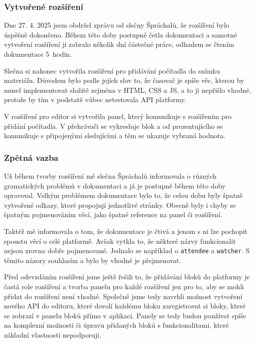 \subsubsection{Vytvořené rozšíření}

Dne 27. 4. 2025 jsem obdržel zprávu od slečny Špráchalů, že rozšíření bylo úspěšně dokončeno.
Během této doby postupně četla dokumentaci a samotné vytvoření rozšíření ji zabralo několik dní částečné práce, odhadem se čtením dokumentace 5~hodin.

Slečna si nakonec vytvořila rozšíření pro přidávání počítadla do snímku materiálu.
Důvodem bylo podle jejích slov to, že časovač je spíše věc, kterou by musel implementovat složitě zejména v HTML, CSS a JS, a to ji nepřišlo vhodné, protože by tím v podstatě vůbec netestovala API platformy.

V rozšíření pro editor si vytvořila panel, který komunikuje s rozšířením pro přidání počítadla. V přehrávači se vykresluje blok a od prezentujícího se komunikuje s připojenými sledujícími a těm se ukazuje vybraná hodnota.

\subsubsection{Zpětná vazba}

Už během tvorby rozšíření mě slečna Špráchalů informovala o různých gramatických problémů v dokumentaci a já je postupně během této doby opravoval.
Velkým problémem dokumentace bylo to, že celou dobu byly špatně vytvořené odkazy, které propojují jednotlivé stránky.
Obecně byly i chyby se špatným pojmenováním věcí, jako špatné reference na panel či rozšíření.

Taktéž mě informovala o tom, že dokumentace je čtivá a jenom s ni lze pochopit spoustu věcí o celé platformě.
Avšak vytkla to, že některé názvy funkcionalit nejsou zrovna dobře pojmenované. 
Jednalo se například o \verb|attendee| a \verb|watcher|.
S těmito názory souhlasím a bylo by vhodné je přejmenovat. 

Před odevzdáním rozšíření jsme ještě řešili to, že přidávání bloků do platformy je častá role rozšíření a tvorba panelu pro každé rozšíření jen pro to, aby se mohli přidat do rozšíření není vhodné.
Společně jsme tedy navrhli možnost vytvoření nového API do editoru, které dovolí každému bloku zaregistrovat si bloky, které se zobrazí v panelu bloků přímo v aplikaci.
Panely se tedy budou používat spíše na komplexní možnosti či úpravu přidaných bloků s funkcionalitami, které základní vlastnosti nepodporují.

